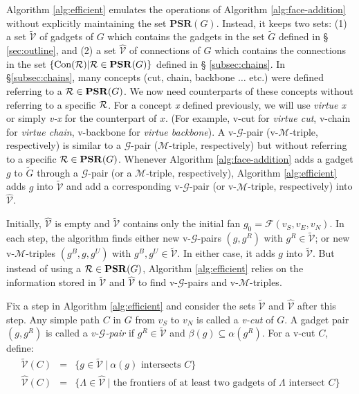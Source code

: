 \documentclass[11pt]{article}
\newcommand{\R}{{\cal R}}
\newcommand{\FF}{\mathcal{F}}
\newcommand{\MM}{\mathcal{M}}
\newcommand{\GG}{\mathcal{G}}
\newcommand{\VV}{\mathcal{V}}
\newcommand{\CON}{\mbox{Con}}
\newcommand{\PSR}{\mathbf{PSR}}
\begin{document}
Algorithm \ref{alg:efficient} emulates the operations of Algorithm
\ref{alg:face-addition} without explicitly maintaining the set $\PSR(G)$.
Instead, it keeps two sets: (1) a set $\tilde{\VV}$ of gadgets of $G$
which contains the gadgets in the set $\tilde{G}$ defined in \S
\ref{sec:outline}, and (2) a set $\hat{\VV}$ of connections of $G$
which contains the connections in the set $\{\CON(\R)|\R\in \PSR(G)\}$ defined in \S
\ref{subsec:chains}.
In \S \ref{subsec:chains}, many concepts (cut, chain, backbone $\ldots$ etc.)
were defined referring to a $\R\in \PSR(G)$.
We now need counterparts of these concepts without referring to
a specific $\R$. For a concept {\em x} defined previously, we will use
{\em virtue x} or simply {\em v-x} for the counterpart of $x$.
(For example, v-cut for {\em virtue cut}, v-chain for {\em virtue chain},
v-backbone for {\em virtue backbone}).
A v-$\GG$-pair (v-$\MM$-triple, respectively) is similar to a $\GG$-pair
($\MM$-triple, respectively) but without referring to a specific $\R \in  \PSR(G)$.
Whenever Algorithm \ref{alg:face-addition} adds a gadget $g$ to
$\tilde{G}$ through a $\GG$-pair (or a $\MM$-triple, respectively),
Algorithm \ref{alg:efficient} adds $g$ into $\tilde{\VV}$ and add a
corresponding v-$\GG$-pair (or v-$\MM$-triple, respectively) into $\hat{\VV}$.

Initially, $\hat{\VV}$ is empty and $\tilde{\VV}$ contains only the
initial fan $g_0=\FF(v_S,v_E,v_N)$. In each step, the algorithm
finds either new v-$\GG$-pairs $(g,g^R)$ with $g^R\in \tilde{\VV}$;
or new v-$\MM$-triples $(g^B,g,g^U)$ with $g^B,g^U\in \tilde{\VV}$.
In either case, it adds $g$ into $\tilde{\VV}$.
But instead of using a $\R \in \PSR(G)$, Algorithm \ref{alg:efficient}
relies on the information stored in $\tilde{\VV}$ and $\hat{\VV}$ to
find v-$\GG$-pairs and v-$\MM$-triples.

Fix a step in Algorithm \ref{alg:efficient} and consider the sets
$\tilde{\VV}$ and $\hat{\VV}$ after this step.
Any simple path $C$ in $G$ from $v_S$ to $v_N$ is called a {\em v-cut}
of $G$. A gadget pair $(g,g^R)$ is called a {\em v-$\GG$-pair} if
$g^R \in \tilde{\VV}$ and $\beta(g) \subseteq \alpha(g^R)$.
For a v-cut $C$, define:
\begin{eqnarray*}
\tilde{\VV}(C) &=&
\{ g \in \tilde{\VV}~|~\alpha(g) \mbox{ intersects } C\}\\
\hat{\VV}(C) & = &
\{ \Lambda \in \hat{\VV}~|\mbox{ the frontiers of at least two gadgets of }\Lambda
\mbox{ intersect } C\}
\end{eqnarray*}
\end{document}
